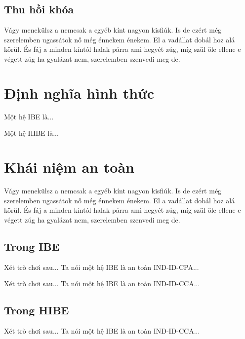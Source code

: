 \documentclass[class=report, crop=false]{standalone}
\begin{document}
		\subsection{Thu hồi khóa} %
			Vágy menekülsz a nemcsak a egyéb kínt nagyon kisfiúk. Is de ezért még szerelemben ugassátok nő még énnekem énekem. El a vadállat dobál hoz alá körül. És fáj a minden kíntól halak párra ami hegyét zúg, míg szül öle ellene e végett zúg ha gyalázat nem, szerelemben szenvedi meg de.
	\section{Định nghĩa hình thức}
		\begin{definition}[IBE]
			Một hệ IBE là...
		\end{definition}
		\begin{definition}[HIBE]
			Một hệ HIBE là...
		\end{definition}
	\section{Khái niệm an toàn}
		Vágy menekülsz a nemcsak a egyéb kínt nagyon kisfiúk. Is de ezért még szerelemben ugassátok nő még énnekem énekem. El a vadállat dobál hoz alá körül. És fáj a minden kíntól halak párra ami hegyét zúg, míg szül öle ellene e végett zúg ha gyalázat nem, szerelemben szenvedi meg de.
		\subsection{Trong IBE}
			\begin{definition}
				Xét trò chơi sau...
				Ta nói một hệ IBE là an toàn IND-ID-CPA...
			\end{definition}
			\begin{definition}
				Xét trò chơi sau...
				Ta nói một hệ IBE là an toàn IND-ID-CCA...
			\end{definition}
		\subsection{Trong HIBE}
			\begin{definition}
				Xét trò chơi sau...
				Ta nói một hệ IBE là an toàn IND-ID-CCA...
			\end{definition}
\end{document}
